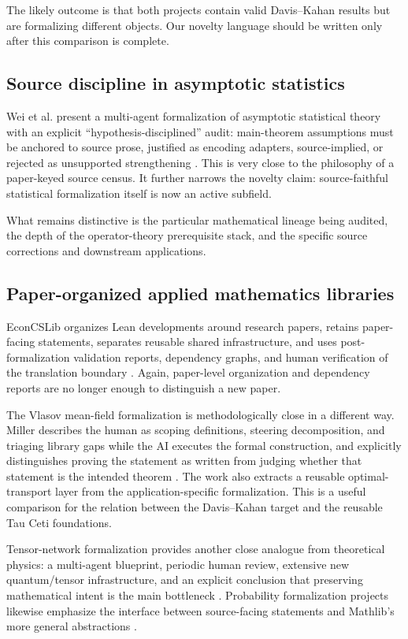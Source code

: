 \documentclass[11pt]{article}
\newcommand{\TauCeti}{Tau Ceti}
\begin{document}
The likely outcome is that both projects contain valid Davis--Kahan results but
are formalizing different objects.  Our novelty language should be written only
after this comparison is complete.

\subsection{Source discipline in asymptotic statistics}

Wei et al. present a multi-agent formalization of asymptotic statistical theory
with an explicit ``hypothesis-disciplined'' audit: main-theorem assumptions must
be anchored to source prose, justified as encoding adapters, source-implied, or
rejected as unsupported strengthening \citep{wei2026asymptotic}.  This is very
close to the philosophy of a paper-keyed source census.  It further narrows the
novelty claim: source-faithful statistical formalization itself is now an active
subfield.

What remains distinctive is the particular mathematical lineage being audited,
the depth of the operator-theory prerequisite stack, and the specific source
corrections and downstream applications.

\subsection{Paper-organized applied mathematics libraries}

EconCSLib organizes Lean developments around research papers, retains
paper-facing statements, separates reusable shared infrastructure, and uses
post-formalization validation reports, dependency graphs, and human verification
of the translation boundary \citep{garg2026econcs}.  Again, paper-level
organization and dependency reports are no longer enough to distinguish a new
paper.

The Vlasov mean-field formalization is methodologically close in a different
way.  Miller describes the human as scoping definitions, steering decomposition,
and triaging library gaps while the AI executes the formal construction, and
explicitly distinguishes proving the statement as written from judging whether
that statement is the intended theorem \citep{miller2026vlasov}.  The work also
extracts a reusable optimal-transport layer from the application-specific
formalization.  This is a useful comparison for the relation between the
Davis--Kahan target and the reusable \TauCeti{} foundations.

Tensor-network formalization provides another close analogue from theoretical
physics: a multi-agent blueprint, periodic human review, extensive new
quantum/tensor infrastructure, and an explicit conclusion that preserving
mathematical intent is the main bottleneck \citep{lu2026tensor}.  Probability
formalization projects likewise emphasize the interface between source-facing
statements and Mathlib's more general abstractions
\citep{deng2026probability,marion2025ionescu}.
\end{document}
